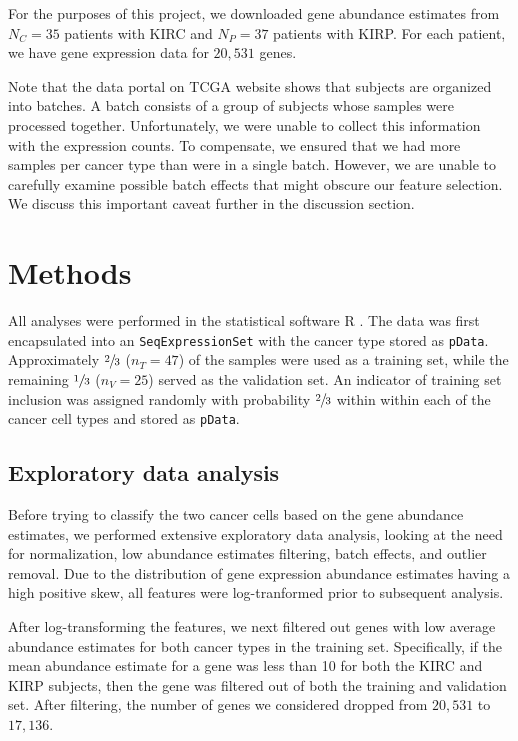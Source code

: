 For the purposes of this project, we downloaded gene abundance estimates from
$N_C =35$ patients with KIRC and $N_P = 37$ patients with KIRP.  For each
patient, we have gene expression data for $20,531$ genes. 

Note that the data portal on TCGA website shows that subjects are organized
into batches.  A batch consists of a group of subjects whose samples were
processed together.  Unfortunately, we were unable to collect this information
with the expression counts. To compensate, we ensured that we had more samples
per cancer type than were in a single batch.  However, we are unable to
carefully examine possible batch effects that might obscure our feature
selection.  We discuss this important caveat further in the discussion
section.

\section{Methods}

All analyses were performed in the statistical software R \cite{rmanual}. The
data was first encapsulated into an \texttt{SeqExpressionSet} \cite{biobase}
with the cancer type stored as \texttt{pData}.
Approximately $\sfrac{2}{3}$ ($n_T = 47$) of the samples were used as a
training set, while the remaining $\sfrac{1}{3}$ ($n_V = 25$) served as the
validation set. An indicator of training set inclusion was assigned randomly
with probability $\sfrac{2}{3}$ within within each of the cancer cell types
and stored as \texttt{pData}.

\subsection*{Exploratory data analysis}

Before trying to classify the two cancer cells based on the gene abundance
estimates, we performed extensive exploratory data analysis, looking at the
need for normalization, low abundance estimates filtering, batch effects, and
outlier removal.  Due to the distribution of gene expression abundance
estimates having a high positive skew, all features were log-tranformed prior
to subsequent analysis.

After log-transforming the features, we next filtered out genes with low
average abundance estimates for both cancer types in the training set.
Specifically, if the mean abundance estimate for a gene was less than 10 for
both the KIRC and KIRP subjects, then the gene was filtered out of both the
training and validation set. After filtering, the number of genes we considered
dropped from $20,531$ to $17,136$.

